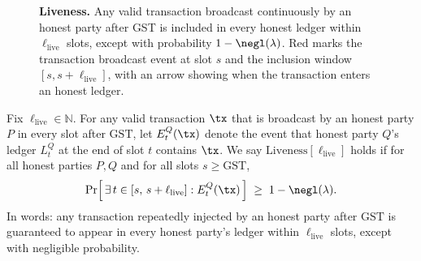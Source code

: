 \begin{figure}[htp!]
\centering
{}
\caption{\textbf{Liveness.} 
\small
Any valid transaction broadcast continuously by an honest party after GST is included in every honest ledger within $\ell_{\mathrm{live}}$ slots, except with probability $1-\negl(\lambda)$. 
Red marks the transaction broadcast event at slot $s$ and the inclusion window $[s,s+\ell_{\mathrm{live}}]$, with an arrow showing when the transaction enters an honest ledger.}

\label{fig:liveness}
\end{figure}


\begin{definition}[Liveness]\label{appdef:liveness}
Fix $\ell_{\mathrm{live}} \in \mathbb{N}$. For any valid transaction $\tx$ that is
broadcast by an honest party $P$ in every slot after $\mathrm{GST}$, let
$E_t^Q(\tx)$ denote the event that honest party $Q$'s ledger $L_t^Q$ at the end of slot $t$
contains $\tx$. We say $\mathrm{Liveness}[\ell_{\mathrm{live}}]$ holds if for all honest parties $P,Q$
and for all slots $s \ge \mathrm{GST}$,
\[
\Pr\!\Big[\, \exists\, t \in [s,\,s+\ell_{\mathrm{live}}] : E_t^Q(\tx) \,\Big] \;\ge\; 1-\negl(\lambda).
\]
In words: any transaction repeatedly injected by an honest party after $\mathrm{GST}$
is guaranteed to appear in every honest party’s ledger within $\ell_{\mathrm{live}}$ slots,
except with negligible probability.
\end{definition}

